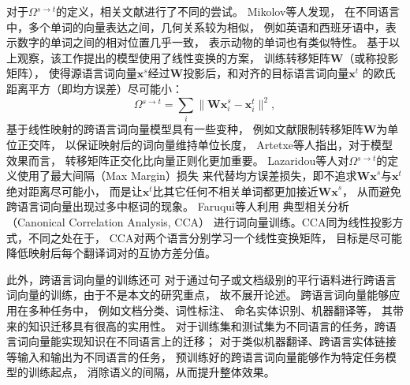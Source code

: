 对于$\Omega{}^{s \rightarrow t}$的定义，相关文献进行了不同的尝试。
Mikolov等人\cite{mikolov2013exploiting}发现，
在不同语言中，多个单词的向量表达之间，几何关系较为相似，
例如英语和西班牙语中，表示数字的单词之间的相对位置几乎一致，
表示动物的单词也有类似特性。
基于以上观察，该工作提出的模型使用了线性变换的方案，
训练转移矩阵$\bm{W}$（或称投影矩阵），
使得源语言词向量$\bm{x}^{s}$经过$\bm{W}$投影后，和对齐的目标语言词向量$\bm{x}^{t}$
的欧氏距离平方（即均方误差）尽可能小：
\begin{equation}
  \Omega{}^{s \rightarrow t} = \sum_i { \| \bm{Wx}_i^s - \bm{x}_{i}^{t}  \|^{2} },
\end{equation}
\noindent
基于线性映射的跨语言词向量模型具有一些变种，
例如文献\parencite{xing2015normalized,zhang2016ten}限制转移矩阵$\bm{W}$为单位正交阵，
以保证映射后的词向量维持单位长度，
Artetxe等人\cite{artetxe2016learning}指出，对于模型效果而言，
转移矩阵正交化比向量正则化更加重要。
Lazaridou等人\cite{lazaridou2015hubness}对$\Omega{}^{s \rightarrow t}$的定义使用了最大间隔（Max Margin）损失
来代替均方误差损失，即不追求$\bm{Wx}^s$与$\bm{x}^t$绝对距离尽可能小，
而是让$\bm{x}^t$比其它任何不相关单词都更加接近$\bm{Wx}^s$，
从而避免跨语言词向量出现过多中枢词的现象。
Faruqui等人\cite{faruqui2014improving}利用
典型相关分析（Canonical Correlation Analysis, CCA）\cite{hotelling1936relations}
进行词向量训练。CCA同为线性投影方式，不同之处在于，
CCA对两个语言分别学习一个线性变换矩阵，
目标是尽可能降低映射后每个翻译词对的互协方差分值。

此外，跨语言词向量的训练还可
对于通过句子或文档级别的平行语料进行跨语言词向量的训练，由于不是本文的研究重点，
故不展开论述。
跨语言词向量能够应用在多种任务中，
例如文档分类\cite{klementiev2012inducing}、词性标注\cite{zhang2016ten}、
命名实体识别\cite{murthy2016sharing}、机器翻译\cite{zou2013bilingual}等，
其带来的知识迁移具有很高的实用性。
对于训练集和测试集为不同语言的任务，跨语言词向量能实现知识在不同语言上的迁移；
对于类似机器翻译、跨语言实体链接等输入和输出为不同语言的任务，
预训练好的跨语言词向量能够作为特定任务模型的训练起点，
消除语义的间隔，从而提升整体效果。











